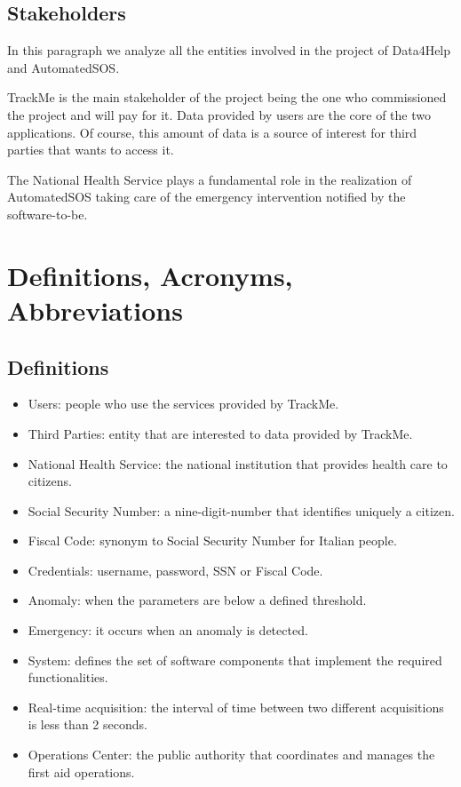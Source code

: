 \subsection{Stakeholders}
In this paragraph we analyze all the entities involved in the project of Data4Help and AutomatedSOS.
\par TrackMe is the main stakeholder of the project being the one who commissioned the project and will pay for it.
Data provided by users are the core of the two applications.
Of course, this amount of data is a source of interest for third parties that wants to access it.
\par The National Health Service plays a fundamental role in the realization of AutomatedSOS taking care of the emergency intervention notified by the software-to-be.
\pagebreak
\section{Definitions, Acronyms, Abbreviations}
\subsection{Definitions}
\begin{itemize}
    \item Users: people who use the services provided by TrackMe.
    \item Third Parties: entity that are interested to data provided by TrackMe.
    \item National Health Service: the national institution that provides health care to citizens.
    \item Social Security Number: a nine-digit-number that identifies uniquely a citizen.
    \item Fiscal Code: synonym to Social Security Number for Italian people.
    \item Credentials: username, password, SSN or Fiscal Code.
    \item Anomaly: when the parameters are below a defined threshold. 
    \item Emergency: it occurs when an anomaly is detected.
    \item System: defines the set of software components that implement the required functionalities.
    \item Real-time acquisition: the interval of time between two different acquisitions is less than 2 seconds.
    \item Operations Center: the public authority that coordinates and manages the first aid operations.
\end{itemize}

